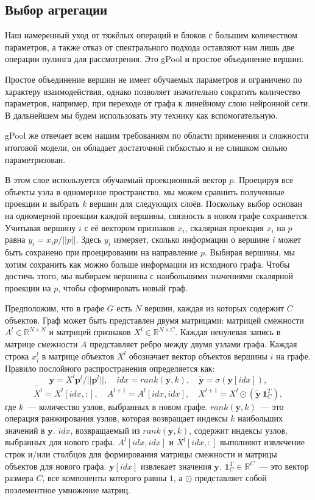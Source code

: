 \documentclass[12pt]{article}
\begin{document}
\subsection{Выбор агрегации}

Наш намеренный уход от тяжёлых операций и блоков с большим количеством параметров, а также отказ от спектрального подхода оставляют нам лишь две операции пулинга для рассмотрения. Это gPool и простое объединение вершин.

Простое объединение вершин не имеет обучаемых параметров и ограничено по характеру взаимодействия, однако позволяет значительно сократить количество параметров, например, при переходе от графа к линейному слою нейронной сети. В дальнейшем мы будем использовать эту технику как вспомогательную.

gPool \cite{gao2019graph} же отвечает всем нашим требованиям по области применения и сложности итоговой модели, он обладает достаточной гибкостью и не слишком сильно параметризован.

В этом слое используется обучаемый проекционный вектор $p$. Проецируя все объекты узла в одномерное пространство, мы можем сравнить полученные проекции и выбрать $k$ вершин для следующих слоёв. Поскольку выбор основан на одномерной проекции каждой вершины, связность в новом графе сохраняется. Учитывая вершину $i$ с её вектором признаков $x_i$, скалярная проекция $x_i$ на $p$ равна $y_i = x_i p / ||p||$. Здесь $y_i$ измеряет, сколько информации о вершине $i$ может быть сохранено при проецировании на направление $p$. Выбирая вершины, мы хотим сохранить как можно больше информации из исходного графа. Чтобы достичь этого, мы выбираем вершины с наибольшими значениями скалярной проекции на $p$, чтобы сформировать новый граф.

Предположим, что в графе $G$ есть $N$ вершин, каждая из которых содержит $C$ объектов. Граф может быть представлен двумя матрицами: матрицей смежности $A^l \in \mathbb{R}^{N \times N}$ и матрицей признаков $X^l \in \mathbb{R}^{N \times C}$. Каждая ненулевая запись в матрице смежности $A$ представляет ребро между двумя узлами графа. Каждая строка $x^l_i$ в матрице объектов $X^l$ обозначает вектор объектов вершины $i$ на графе. Правило послойного распространения определяется как:
$$\pmb{y} = X^l \pmb{p}^l / ||\pmb{p}^l||, \quad idx = rank(\pmb{y}, k), \quad \tilde{\pmb{y}} = \sigma(\pmb{y}[idx]), $$
$$ \tilde{X^l} = X^l[idx, :], \quad A^{l+1} = A^{l}[idx,idx], \quad X^{l+1} = X^{l} \odot (\tilde{\pmb{y}}\ \pmb{1}^T_C),$$
где $k$~--- количество узлов, выбранных в новом графе. $rank(\pmb{y}, k)$~--- это операция ранжирования узлов, которая возвращает индексы $k$ наибольших значений в $\pmb{y}$. $idx$, возвращаемый из $rank(\pmb{y}, k)$, содержит индексы узлов, выбранных для нового графа. $A^{l}[idx,idx]$ и $X^l[idx, :]$ выполняют извлечение строк и/или столбцов для формирования матрицы смежности и матрицы объектов для нового графа. $\pmb{y}[idx]$ извлекает значения $\pmb{y}$. $\pmb{1}^T_C \in \mathbb{R}^C$~--- это вектор размера $C$, все компоненты которого равны $1$, а $\odot$ представляет собой поэлементное умножение матриц.
\end{document}
